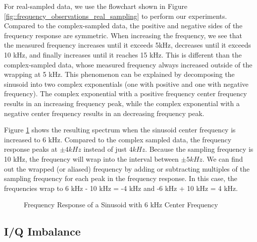 \documentclass{article}
\begin{document}
For real-sampled data, we use the flowchart shown in Figure \ref{fig::frequency_observations_real_sampling} to perform our experiments. Compared to the complex-sampled data, the positive and negative sides of the frequency response are symmetric. When increasing the frequency, we see that the measured frequency increases until it exceeds 5kHz, decreases until it exceeds 10 kHz, and finally increases until it reaches 15 kHz. This is different than the complex-sampled data, whose measured frequency always increased outside of the wrapping at 5 kHz. This phenomenon can be explained by decomposing the sinusoid into two complex exponentials (one with positive and one with negative frequency). The complex exponential with a positive frequency center frequency results in an increasing frequency peak, while the complex exponential with a negative center frequency results in an decreasing frequency peak.

Figure \ref{fig::freq_observations_real_6k_center_freq} shows the resulting spectrum when the sinusoid center frequency is increased to 6 kHz. Compared to the complex sampled data, the frequency response peaks at $\pm 4 kHz$ instead of just $4 kHz$. Because the sampling frequency is 10 kHz, the frequency will wrap into the interval between $\pm 5 kHz$. We can find out the wrapped (or aliased) frequency by adding or subtracting multiples of the sampling frequency for each peak in the frequency response. In this case, the frequencies wrap to 6 kHz - 10 kHz = -4 kHz and -6 kHz + 10 kHz = 4 kHz. 

\begin{figure}[H]
	\centerline{}
	\caption{Frequency Response of a Sinusoid with 6 kHz Center Frequency}
	\label{fig::freq_observations_real_6k_center_freq}
\end{figure}

\subsection{I/Q Imbalance}
\end{document}
